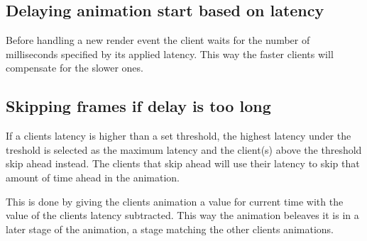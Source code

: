 \subsection{Delaying animation start based on latency}
Before handling a new render event the client waits for the number of milliseconds specified by its applied latency. This way the faster clients will compensate for the slower ones. 

\subsection{Skipping frames if delay is too long}
If a clients latency is higher than a set threshold, the highest latency under the treshold is selected as the maximum latency and the client(s) above the threshold skip ahead instead. The clients that skip ahead will use their latency to skip that amount of time ahead in the animation. 

This is done by giving the clients animation a value for current time with the value of the clients latency subtracted. This way the animation beleaves it is in a later stage of the animation, a stage matching the other clients animations.


